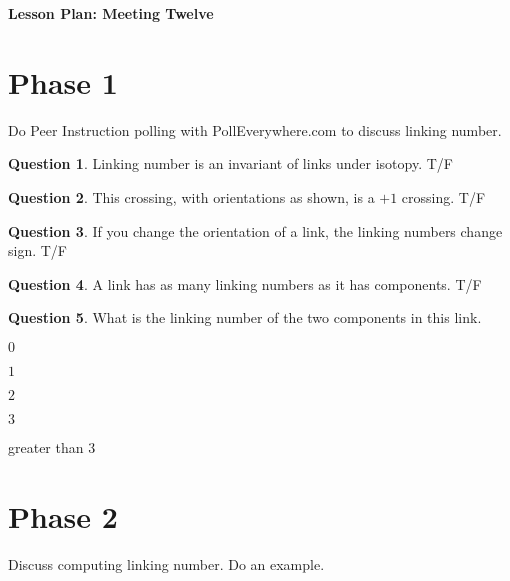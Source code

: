 \documentclass[12pt]{amsart}
\theoremstyle{definition}
\newtheorem{question}{Question}
\begin{document}
\begin{center}
\textbf{\Huge
Lesson Plan: Meeting Twelve
}
\end{center}
\vspace{.5in}

\section*{Phase 1}
Do Peer Instruction polling with PollEverywhere.com to discuss linking number.

\begin{question}
Linking number is an invariant of links under isotopy. T/F
\end{question}

\begin{question}
This crossing, with orientations as shown, is a $+1$ crossing. T/F
\end{question}

\begin{question}
If you change the orientation of a link, the linking numbers change sign. T/F
\end{question}

\begin{question}
A link has as many linking numbers as it has components. T/F
\end{question}

\begin{question}
What is the linking number of the two components in this link.
\begin{compactitem}
\item $0$ 
\item $1$
\item $2$
\item $3$
\item greater than $3$
\end{compactitem}
\end{question}

\section*{Phase 2}
Discuss computing linking number. 
Do an example.
\end{document}
